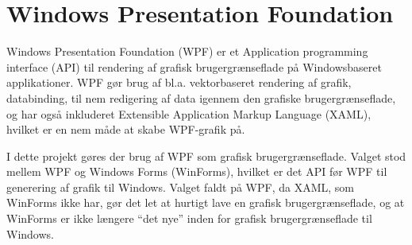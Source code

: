 \section{Windows Presentation Foundation}
Windows Presentation Foundation (WPF) er et Application programming interface (API) til rendering af grafisk brugergrænseflade på Windowsbaseret applikationer. WPF gør brug af  bl.a. vektorbaseret rendering af grafik, databinding, til nem redigering af data igennem den grafiske brugergrænseflade, og har også inkluderet Extensible Application Markup Language (XAML), hvilket er en nem måde at skabe WPF-grafik på.\citep{wpf} 

I dette projekt gøres der brug af WPF som grafisk brugergrænseflade. Valget stod mellem WPF og Windows Forms (WinForms), hvilket er det API før WPF til generering af grafik til Windows. 
Valget faldt på WPF, da XAML, som WinForms ikke har, gør det let at hurtigt lave en grafisk brugergrænseflade, og at WinForms er ikke længere ``det nye'' inden for grafisk brugergrænseflade til Windows. 

